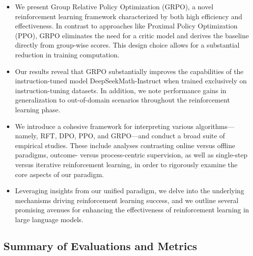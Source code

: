 \begin{itemize}[topsep=0pt]
    \item We present Group Relative Policy Optimization (GRPO), a novel reinforcement learning framework characterized by both high efficiency and effectiveness. In contrast to approaches like Proximal Policy Optimization (PPO), GRPO eliminates the need for a critic model and derives the baseline directly from group-wise scores. This design choice allows for a substantial reduction in training computation.
    \item Our results reveal that GRPO substantially improves the capabilities of the instruction-tuned model DeepSeekMath-Instruct when trained exclusively on instruction-tuning datasets. In addition, we note performance gains in generalization to out-of-domain scenarios throughout the reinforcement learning phase.
    \item We introduce a cohesive framework for interpreting various algorithms—namely, RFT, DPO, PPO, and GRPO—and conduct a broad suite of empirical studies. These include analyses contrasting online versus offline paradigms, outcome- versus process-centric supervision, as well as single-step versus iterative reinforcement learning, in order to rigorously examine the core aspects of our paradigm.
    \item Leveraging insights from our unified paradigm, we delve into the underlying mechanisms driving reinforcement learning success, and we outline several promising avenues for enhancing the effectiveness of reinforcement learning in large language models.
\end{itemize}

\subsection{Summary of Evaluations and Metrics}

